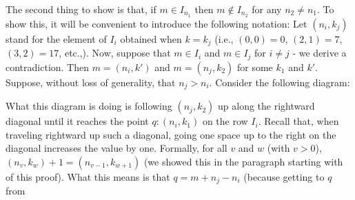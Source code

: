 \documentclass{article}
\theoremstyle{definition}
\begin{document}
The second thing to show is that, if $m\in I_{n_1}$ then $m\notin I_{n_2}$ for any $n_2\ne n_1$. To show this, it will be convenient
to introduce the following notation: Let $(n_i,k_j)$ stand for the element of $I_i$ obtained when $k=k_j$ (i.e., 
$(0,0)=0$, $(2,1)=7$, $(3,2)=17$, etc.,). Now, suppose that 
$m\in I_i$ and $m\in I_j$ for $i\ne j$ - we derive a contradiction. Then $m=(n_i,k')$ and $m=(n_j,k_2)$ for some $k_1$ and $k'$. Suppose, without loss of 
generality, that $n_j>n_i$. Consider the following diagram:
\begin{center}
\end{center}
What this diagram is doing is following $(n_j,k_2)$ up along the rightward diagonal until it reaches the point $q:(n_i,k_1)$ on the row 
$I_i$. Recall that, when traveling rightward up such a diagonal, going one space up to the right on 
the diagonal increases the value by one. Formally, for all $v$ and $w$ (with $v>0$), $(n_v,k_w)+1=(n_{v-1},k_{w+1})$ (we showed this in the 
paragraph starting with  of this proof). What this means is that $q=m+n_j-n_i$ (because getting to $q$ from 
\end{document}
